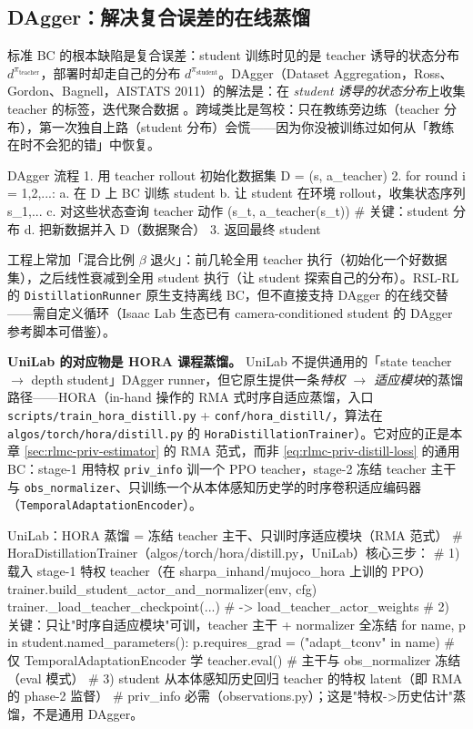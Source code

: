 \subsection{DAgger：解决复合误差的在线蒸馏}
\label{sec:rlmc-priv-dagger}

标准 BC 的根本缺陷是复合误差：student 训练时见的是 teacher 诱导的状态分布 $d^{\pi_{\text{teacher}}}$，部署时却走自己的分布 $d^{\pi_{\text{student}}}$。DAgger（Dataset Aggregation，Ross、Gordon、Bagnell，AISTATS 2011）的解法是：在 \emph{student 诱导的状态分布}上收集 teacher 的标签，迭代聚合数据 \cite{ross2011dagger}。跨域类比是驾校：只在教练旁边练（teacher 分布），第一次独自上路（student 分布）会慌——因为你没被训练过如何从「教练在时不会犯的错」中恢复。

\begin{codebox}[text]{DAgger 流程}
1. 用 teacher rollout 初始化数据集 D = {(s, a_teacher)}
2. for round i = 1,2,...:
   a. 在 D 上 BC 训练 student
   b. 让 student 在环境 rollout，收集状态序列 {s_1,...}
   c. 对这些状态查询 teacher 动作 {(s_t, a_teacher(s_t))}   # 关键：student 分布
   d. 把新数据并入 D（数据聚合）
3. 返回最终 student
\end{codebox}

工程上常加「混合比例 $\beta$ 退火」：前几轮全用 teacher 执行（初始化一个好数据集），之后线性衰减到全用 student 执行（让 student 探索自己的分布）。RSL-RL 的 \verb|DistillationRunner| 原生支持离线 BC，但不直接支持 DAgger 的在线交替——需自定义循环（Isaac Lab 生态已有 camera-conditioned student 的 DAgger 参考脚本可借鉴）。

\textbf{UniLab 的对应物是 HORA 课程蒸馏。} UniLab 不提供通用的「state teacher $\to$ depth student」DAgger runner，但它原生提供一条\emph{特权 $\to$ 适应模块}的蒸馏路径——HORA（in-hand 操作的 RMA 式时序自适应蒸馏，入口 \verb|scripts/train_hora_distill.py| + \verb|conf/hora_distill/|，算法在 \verb|algos/torch/hora/distill.py| 的 \verb|HoraDistillationTrainer|）\cite{unilab2026}。它对应的正是本章 \cref{sec:rlmc-priv-estimator} 的 RMA 范式，而非 \cref{eq:rlmc-priv-distill-loss} 的通用 BC：stage-1 用特权 \verb|priv_info| 训一个 PPO teacher，stage-2 冻结 teacher 主干与 \verb|obs_normalizer|、只训练一个从本体感知历史学的时序卷积适应编码器（\verb|TemporalAdaptationEncoder|）。

\begin{codebox}[Python]{UniLab：HORA 蒸馏 = 冻结 teacher 主干、只训时序适应模块（RMA 范式）}
# HoraDistillationTrainer（algos/torch/hora/distill.py，UniLab）核心三步：
# 1) 载入 stage-1 特权 teacher（在 sharpa_inhand/mujoco_hora 上训的 PPO）
trainer.build_student_actor_and_normalizer(env, cfg)
trainer._load_teacher_checkpoint(...)          # -> load_teacher_actor_weights
# 2) 关键：只让"时序自适应模块"可训，teacher 主干 + normalizer 全冻结
for name, p in student.named_parameters():
    p.requires_grad = ("adapt_tconv" in name)  # 仅 TemporalAdaptationEncoder 学
teacher.eval()                                 # 主干与 obs_normalizer 冻结（eval 模式）
# 3) student 从本体感知历史回归 teacher 的特权 latent（即 RMA 的 phase-2 监督）
#    priv_info 必需（observations.py）；这是"特权->历史估计"蒸馏，不是通用 DAgger。
\end{codebox}

